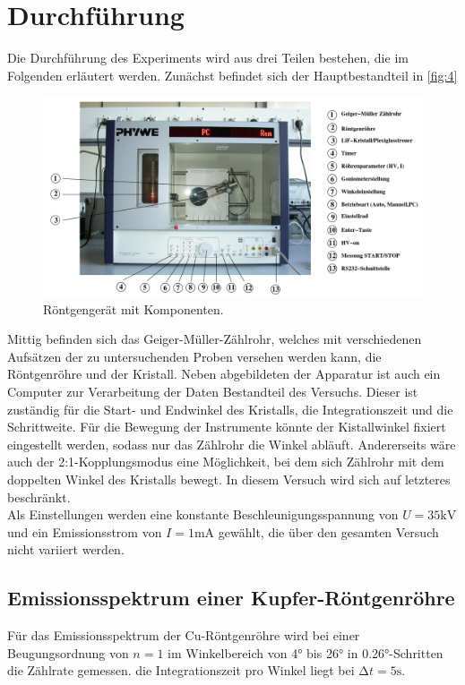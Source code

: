 \section{Durchführung}
\label{sec:Durchführung}

Die Durchführung des Experiments wird aus drei Teilen bestehen, die im Folgenden 
erläutert werden. Zunächst befindet sich der Hauptbestandteil in \autoref{fig:4} 
\begin{figure}[H]
    \centering
        \centering
        \includegraphics[width=\textwidth]{bilder/roehre.png}
        \caption{Röntgengerät mit Komponenten. \cite{anleitung10}}
    \hfill
    \label{fig:4}
\end{figure}
\noindent Mittig befinden sich das Geiger-Müller-Zählrohr, welches mit verschiedenen 
Aufsätzen der zu untersuchenden Proben versehen werden kann, die Röntgenröhre und 
der Kristall. Neben abgebildeten der Apparatur ist auch ein Computer zur
Verarbeitung der Daten Bestandteil des Versuchs. Dieser ist zuständig für die
Start- und Endwinkel des Kristalls, die Integrationszeit und die Schrittweite.
Für die Bewegung der Instrumente könnte der Kistallwinkel fixiert eingestellt 
werden, sodass nur das Zählrohr die Winkel abläuft. Andererseits wäre auch der 
2:1-Kopplungsmodus eine Möglichkeit, bei dem sich Zählrohr mit dem doppelten 
Winkel des Kristalls bewegt. In diesem Versuch wird sich auf letzteres beschränkt. 
\vspace{0.5em}
\\
\noindent Als Einstellungen werden eine konstante Beschleunigungsspannung von 
$U = 35 \unit{\kilo\volt}$ und ein Emissionsstrom von $I = 1 \unit{\milli\ampere}$
gewählt, die über den gesamten Versuch nicht variiert werden.

\subsection{Emissionsspektrum einer Kupfer-Röntgenröhre}
Für das Emissionsspektrum der Cu-Röntgenröhre wird bei einer Beugungsordnung von 
$n = 1$ im Winkelbereich von 4° bis 26° in 0.26°-Schritten die Zählrate gemessen.
die Integrationszeit pro Winkel liegt bei $\increment t = 5 \unit{\second}$.

